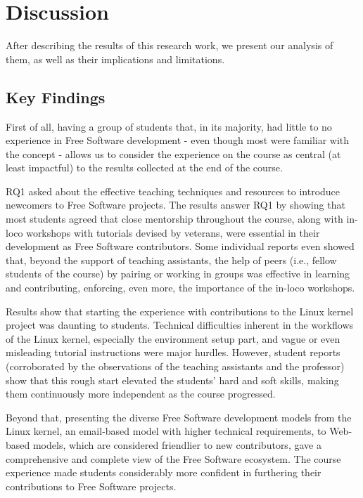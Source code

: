 \section{Discussion}

After describing the results of this research work, we present our analysis of
them, as well as their implications and limitations.

\subsection{Key Findings}

First of all, having a group of students that, in its majority, had little to no
experience in Free Software development - even though most were familiar with
the concept - allows us to consider the experience on the course as central (at
least impactful) to the results collected at the end of the course.

RQ1 asked about the effective teaching techniques and resources to introduce
newcomers to Free Software projects. The results answer RQ1 by showing that most
students agreed that close mentorship throughout the course, along with in-loco
workshops with tutorials devised by veterans, were essential in their
development as Free Software contributors. Some individual reports even showed
that, beyond the support of teaching assistants, the help of peers (i.e., fellow
students of the course) by pairing or working in groups was effective in
learning and contributing, enforcing, even more, the importance of the in-loco
workshops.

Results show that starting the experience with contributions to the Linux kernel
project was daunting to students. Technical difficulties inherent in the
workflows of the Linux kernel, especially the environment setup part, and vague
or even misleading tutorial instructions were major hurdles. However, student
reports (corroborated by the observations of the teaching assistants and the
professor) show that this rough start elevated the students' hard and soft
skills, making them continuously more independent as the course progressed.

Beyond that, presenting the diverse Free Software development models from the
Linux kernel, an email-based model with higher technical requirements, to
Web-based models, which are considered friendlier to new contributors, gave a
comprehensive and complete view of the Free Software ecosystem. The course
experience made students considerably more confident in furthering their
contributions to Free Software projects.


